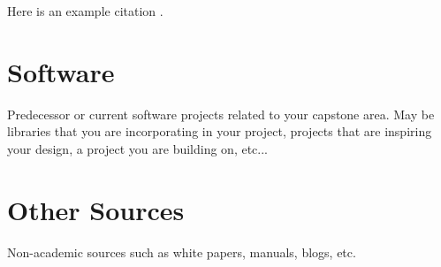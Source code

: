 Here is an example citation \cite{Doe2017}.




\section{Software}

Predecessor or current software projects related to your capstone area. May be libraries that you are incorporating in your project, projects that are inspiring your design, a project you are building on, etc...




\section{Other Sources}

Non-academic sources such as white papers, manuals, blogs, etc.

